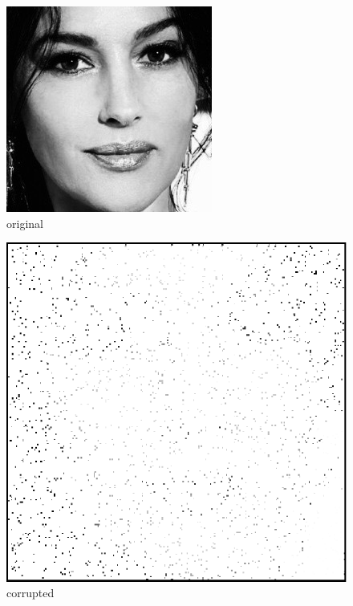 \documentclass[
  american,
]{article}
\begin{document}
\begin{figure}[H]
    \centering
    \begin{minipage}{0.3\linewidth}
        \centering
        \includegraphics[width=\textwidth]{img/img_original.jpg}\\original
    \end{minipage}\hfill%
    \begin{minipage}{0.3\linewidth}
        \centering
        \includegraphics[width=\textwidth]{img/img_corrupted.png}\\corrupted

\end{minipage}
\end{figure}
\end{document}
